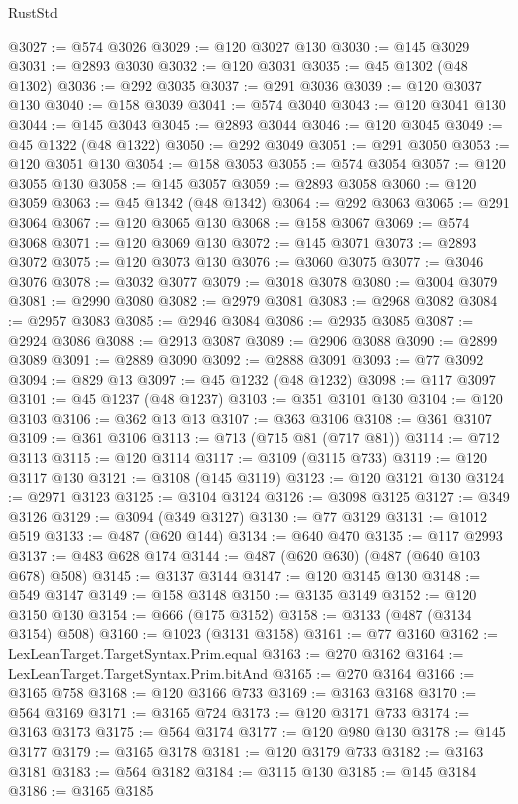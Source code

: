 \begin{lexlean}{RustStd}
\begin{coremodule}
@3027 := @574 @3026
@3029 := @120 @3027 @130
@3030 := @145 @3029
@3031 := @2893 @3030
@3032 := @120 @3031
@3035 := @45 @1302 (@48 @1302)
@3036 := @292 @3035
@3037 := @291 @3036
@3039 := @120 @3037 @130
@3040 := @158 @3039
@3041 := @574 @3040
@3043 := @120 @3041 @130
@3044 := @145 @3043
@3045 := @2893 @3044
@3046 := @120 @3045
@3049 := @45 @1322 (@48 @1322)
@3050 := @292 @3049
@3051 := @291 @3050
@3053 := @120 @3051 @130
@3054 := @158 @3053
@3055 := @574 @3054
@3057 := @120 @3055 @130
@3058 := @145 @3057
@3059 := @2893 @3058
@3060 := @120 @3059
@3063 := @45 @1342 (@48 @1342)
@3064 := @292 @3063
@3065 := @291 @3064
@3067 := @120 @3065 @130
@3068 := @158 @3067
@3069 := @574 @3068
@3071 := @120 @3069 @130
@3072 := @145 @3071
@3073 := @2893 @3072
@3075 := @120 @3073 @130
@3076 := @3060 @3075
@3077 := @3046 @3076
@3078 := @3032 @3077
@3079 := @3018 @3078
@3080 := @3004 @3079
@3081 := @2990 @3080
@3082 := @2979 @3081
@3083 := @2968 @3082
@3084 := @2957 @3083
@3085 := @2946 @3084
@3086 := @2935 @3085
@3087 := @2924 @3086
@3088 := @2913 @3087
@3089 := @2906 @3088
@3090 := @2899 @3089
@3091 := @2889 @3090
@3092 := @2888 @3091
@3093 := @77 @3092
@3094 := @829 @13
@3097 := @45 @1232 (@48 @1232)
@3098 := @117 @3097
@3101 := @45 @1237 (@48 @1237)
@3103 := @351 @3101 @130
@3104 := @120 @3103
@3106 := @362 @13 @13
@3107 := @363 @3106
@3108 := @361 @3107
@3109 := @361 @3106
@3113 := @713 (@715 @81 (@717 @81))
@3114 := @712 @3113
@3115 := @120 @3114
@3117 := @3109 (@3115 @733)
@3119 := @120 @3117 @130
@3121 := @3108 (@145 @3119)
@3123 := @120 @3121 @130
@3124 := @2971 @3123
@3125 := @3104 @3124
@3126 := @3098 @3125
@3127 := @349 @3126
@3129 := @3094 (@349 @3127)
@3130 := @77 @3129
@3131 := @1012 @519
@3133 := @487 (@620 @144)
@3134 := @640 @470
@3135 := @117 @2993
@3137 := @483 @628 @174
@3144 := @487 (@620 @630) (@487 (@640 @103 @678) @508)
@3145 := @3137 @3144
@3147 := @120 @3145 @130
@3148 := @549 @3147
@3149 := @158 @3148
@3150 := @3135 @3149
@3152 := @120 @3150 @130
@3154 := @666 (@175 @3152)
@3158 := @3133 (@487 (@3134 @3154) @508)
@3160 := @1023 (@3131 @3158)
@3161 := @77 @3160
@3162 := LexLeanTarget.TargetSyntax.Prim.equal
@3163 := @270 @3162
@3164 := LexLeanTarget.TargetSyntax.Prim.bitAnd
@3165 := @270 @3164
@3166 := @3165 @758
@3168 := @120 @3166 @733
@3169 := @3163 @3168
@3170 := @564 @3169
@3171 := @3165 @724
@3173 := @120 @3171 @733
@3174 := @3163 @3173
@3175 := @564 @3174
@3177 := @120 @980 @130
@3178 := @145 @3177
@3179 := @3165 @3178
@3181 := @120 @3179 @733
@3182 := @3163 @3181
@3183 := @564 @3182
@3184 := @3115 @130
@3185 := @145 @3184
@3186 := @3165 @3185

\end{coremodule}
\end{lexlean}
